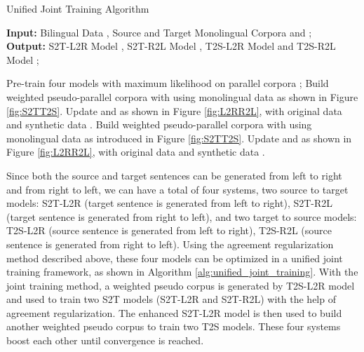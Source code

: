 \documentclass[a4paper]{article}
\begin{document}
\begin{CJK*}{UTF8}{gbsn}
\begin{algorithm}[t]
\caption{Unified Joint Training Algorithm}
\label{alg:unified_joint_training}
\hspace*{\algorithmicindent} \textbf{Input:} Bilingual Data ,  Source and Target Monolingual Corpora  and ;  \\
\hspace*{\algorithmicindent} \textbf{Output:} S2T-L2R Model , S2T-R2L Model , T2S-L2R Model  and T2S-R2L Model ;
\begin{algorithmic}[1]
\State Pre-train four models with maximum likelihood on parallel corpora ;
\State Build weighted pseudo-parallel corpora  with  using monolingual data  as shown in Figure \ref{fig:S2TT2S}.
\State Update  and   as shown in Figure \ref{fig:L2RR2L}, with original data  and synthetic data .
\State Build weighted pseudo-parallel corpora  with  using monolingual data  as introduced in Figure \ref{fig:S2TT2S}. 
\State Update  and  as shown in Figure \ref{fig:L2RR2L}, with original data  and synthetic data .
\EndWhile
\EndProcedure
\end{algorithmic}
\end{algorithm}

Since both the source and target sentences can be generated from left to right and from right to left, we can have a total of four systems, two source to target models: S2T-L2R (target sentence is generated from left to right), S2T-R2L (target sentence is generated from right to left), and two target to source models: T2S-L2R (source sentence is generated from left to right), T2S-R2L (source sentence is generated from right to left). Using the agreement regularization method described above, these four models can be optimized in a unified joint training framework, as shown in Algorithm \ref{alg:unified_joint_training}. With the joint training method, a weighted pseudo corpus is generated by T2S-L2R model and used to train two S2T models (S2T-L2R and S2T-R2L) with the help of agreement regularization. The enhanced S2T-L2R model is then used to build another weighted pseudo corpus to train two T2S models. These four systems boost each other until convergence is reached. 


\end{CJK*}
\end{document}
